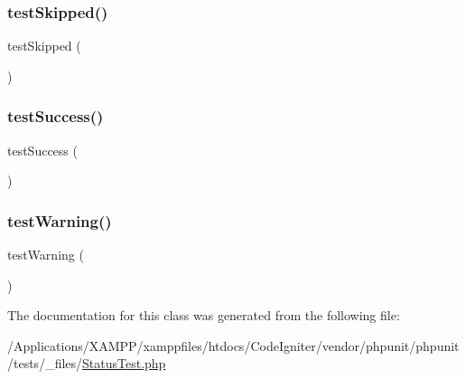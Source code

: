 \subsubsection{\texorpdfstring{test\+Skipped()}{testSkipped()}}
{\footnotesize\ttfamily test\+Skipped (\begin{DoxyParamCaption}{ }\end{DoxyParamCaption})}

\mbox{\label{class_status_test_a08a071ac504d50530175972e1a53eca9}} 
\subsubsection{\texorpdfstring{test\+Success()}{testSuccess()}}
{\footnotesize\ttfamily test\+Success (\begin{DoxyParamCaption}{ }\end{DoxyParamCaption})}

\mbox{\label{class_status_test_ab3d769bb4c6d720587b0ed0256641a59}} 
\subsubsection{\texorpdfstring{test\+Warning()}{testWarning()}}
{\footnotesize\ttfamily test\+Warning (\begin{DoxyParamCaption}{ }\end{DoxyParamCaption})}



The documentation for this class was generated from the following file\+:\begin{DoxyCompactItemize}
\item 
/\+Applications/\+X\+A\+M\+P\+P/xamppfiles/htdocs/\+Code\+Igniter/vendor/phpunit/phpunit/tests/\+\_\+files/\mbox{\hyperlink{_status_test_8php}{Status\+Test.\+php}}\end{DoxyCompactItemize}
